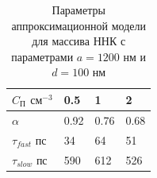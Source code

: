 \documentclass[a4paper,14pt,russian]{extreport}
\begin{document}
\begin{table}
\centering
\caption{Параметры аппроксимационной модели для массива ННК с параметрами $a = 1200$ нм и $d = 100$ нм}
\label{table:Coefitients1200100}
\begin{tabular}{@{}llll@{}}
\toprule
$C_\text{П}$ $\text{см}^{-3}$ & 0.5 & 1  & 2   \\ \midrule
$\alpha$                                               & 0.92   & 0.76 & 0.68\\
$\tau_{fast}$ пс                                       & 34   & 64  & 51  \\
$\tau_{slow}$ пс                                       & 590 & 612 & 526 \\ \bottomrule
\end{tabular}
\end{table}
\end{document}
